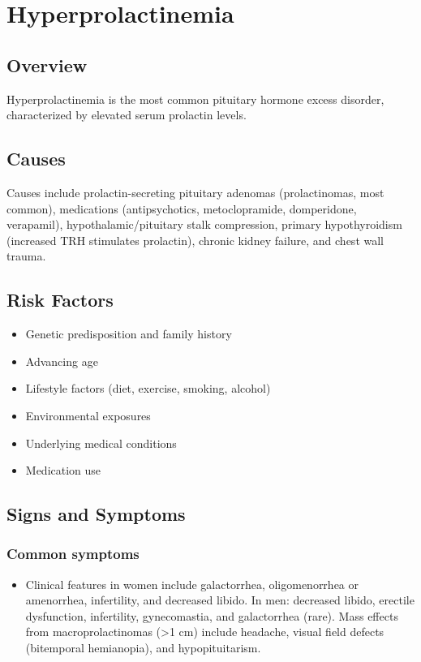 \chapter{Hyperprolactinemia}
\label{sec:Hyperprolactinemia}

\section{Overview}
Hyperprolactinemia is the most common pituitary hormone excess disorder, characterized by elevated serum prolactin levels.
\section{Causes}
Causes include prolactin-secreting pituitary adenomas (prolactinomas, most common), medications (antipsychotics, metoclopramide, domperidone, verapamil), hypothalamic/pituitary stalk compression, primary hypothyroidism (increased TRH stimulates prolactin), chronic kidney failure, and chest wall trauma.     
\section{Risk Factors}

\begin{itemize}[noitemsep]
  \item Genetic predisposition and family history
  \item Advancing age
  \item Lifestyle factors (diet, exercise, smoking, alcohol)
  \item Environmental exposures
  \item Underlying medical conditions
  \item Medication use
\end{itemize}
\section{Signs and Symptoms}

\subsection{Common symptoms}
\begin{itemize}[noitemsep]
  \item Clinical features in women include galactorrhea, oligomenorrhea or amenorrhea, infertility, and decreased libido. In men: decreased libido, erectile dysfunction, infertility, gynecomastia, and galactorrhea (rare). Mass effects from macroprolactinomas (>1 cm) include headache, visual field defects (bitemporal hemianopia), and hypopituitarism. 
  \end{itemize}

